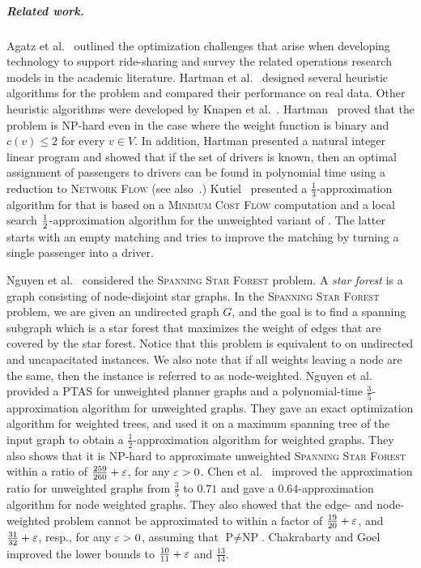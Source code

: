 
\subparagraph{Related work.}
%
Agatz et al.~\cite{agatz2012optimization} outlined the optimization
challenges that arise when developing technology to support
ride-sharing and survey the related operations research models in the
academic literature.
%
Hartman et al.~\cite{hartman2014theory} designed several heuristic
algorithms for the \carpool problem and compared their performance on
real data.  Other heuristic algorithms were developed by Knapen et
al.~\cite{knapen2014exploiting}.
%
Hartman~\cite{hartman2013optimal} proved that the \carpool problem is
NP-hard even in the case where the weight function is binary and
$c(v) \leq 2$ for every $v \in V$.  In addition, Hartman presented a
natural integer linear program and showed that if the set of drivers
is known, then an optimal assignment of passengers to drivers can be
found in polynomial time using a reduction to \textsc{Network Flow}
(see also~\cite{kutiel2016}.)
%
Kutiel~\cite{kutiel2016} presented a $\frac{1}{3}$-approximation
algorithm for \carpool that is based on a \textsc{Minimum Cost Flow}
computation and a local search $\frac{1}{2}$-approximation algorithm for the
unweighted variant of \carpool.  The latter starts with an empty
matching and tries to improve the matching by turning a single
passenger into a driver.

Nguyen et al.~\cite{nguyen2008approximating} considered
the \textsc{Spanning Star Forest} problem.  A \emph{star forest} is a
graph consisting of node-disjoint star graphs.  In
the \textsc{Spanning Star Forest} problem, we are given an undirected
graph $G$, and the goal is to find a spanning subgraph which is a star
forest that maximizes the weight of edges that are covered by the star
forest.  Notice that this problem is equivalent to \carpool on
undirected and uncapacitated instances.  We also note that if all
weights leaving a node are the same, then the instance is referred to
as node-weighted.
%
Nguyen et al.~\cite{nguyen2008approximating} provided a PTAS for
unweighted planner graphs and a polynomial-time
$\frac{3}{5}$-approximation algorithm for unweighted graphs.  They
gave an exact optimization algorithm for weighted trees, and used it
on a maximum spanning tree of the input graph to obtain a
$\frac{1}{2}$-approximation algorithm for weighted graphs.  They also
shows that it is NP-hard to approximate unweighted \textsc{Spanning
Star Forest} within a ratio of $\frac{259}{260}+\varepsilon$, for any
$\varepsilon>0$.
%
%
Chen et al.~\cite{CENRRS13} improved the approximation ratio for
unweighted graphs from $\frac{3}{5}$ to $0.71$ and gave a
$0.64$-approximation algorithm for node weighted graphs.  They also
showed that the edge- and node-weighted problem cannot be approximated
to within a factor of $\frac{19}{20} + \varepsilon$, and $\frac{31}{32}
+ \varepsilon$, resp., for any $\varepsilon > 0$, assuming that
$\text{P} \neq \text{NP}$.
%
Chakrabarty and Goel~\cite{ChakrabartyGoel10} improved the lower bounds
to $\frac{10}{11} + \varepsilon$ and $\frac{13}{14}$.

